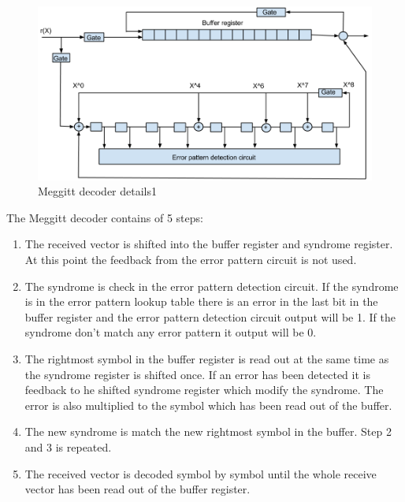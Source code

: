 \documentclass[Main]{subfiles}
\begin{document}
\begin{figure}[htbp]
\centering
\includegraphics[width=0.7\linewidth]{./Picture/MeggittCircuit}
\caption[Meggit Decoder example]{Meggitt decoder details1}
\label{fig:Meggitt_decoder_example}
\end{figure}

\noindent The Meggitt decoder contains of 5 steps:
\begin{enumerate}
\item The received vector is shifted into the buffer register and syndrome register.
At this point the feedback from the error pattern circuit is not used.
\item The syndrome is check in the error pattern detection circuit.
If the syndrome is in the error pattern lookup table there is an error in the last bit in the buffer register and the error pattern detection circuit output will be 1.
If the syndrome don't match any error pattern it output will be 0.
\item The rightmost symbol in the buffer register is read out at the same time as the syndrome register is shifted once.
If an error has been detected it is feedback to he shifted syndrome register which modify the syndrome.
The error is also multiplied to the symbol which has been read out of the buffer. 
\item The new syndrome is match the new rightmost symbol in the buffer.
Step 2 and 3 is repeated.
\item The received vector is decoded symbol by symbol until the whole receive vector has been read out of the buffer register.
\end{enumerate}
\end{document}
